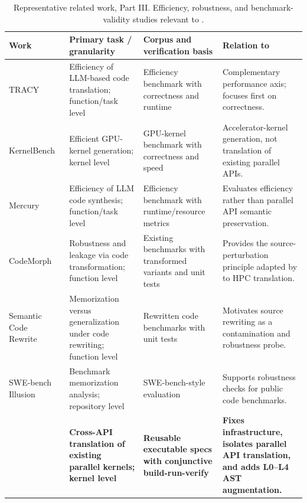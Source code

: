 \begin{table}[p]
\centering
\caption{
Representative related work, Part III. Efficiency, robustness, and benchmark-validity studies relevant to \parbench{}.
}
\label{tab:related-work-d}
\scriptsize
\setlength{\tabcolsep}{3.2pt}
\renewcommand{\arraystretch}{1.05}
\begin{tabularx}{\textwidth}{@{}
>{\RaggedRight\arraybackslash}p{}
>{\RaggedRight\arraybackslash}p{}
>{\RaggedRight\arraybackslash}p{}
>{\RaggedRight\arraybackslash}X
@{}}
\toprule
Work & Primary task / granularity & Corpus and verification basis & Relation to \parbench{} \\
\midrule

TRACY~\cite{TRACY2025}
& Efficiency of LLM-based code translation; function/task level
& Efficiency benchmark with correctness and runtime
& Complementary performance axis; \parbench{} focuses first on correctness. \\

KernelBench~\cite{KernelBench2025}
& Efficient GPU-kernel generation; kernel level
& GPU-kernel benchmark with correctness and speed
& Accelerator-kernel generation, not translation of existing parallel APIs. \\

Mercury~\cite{Mercury2024}
& Efficiency of LLM code synthesis; function/task level
& Efficiency benchmark with runtime/resource metrics
& Evaluates efficiency rather than parallel API semantic preservation. \\

CodeMorph~\cite{CodeMorph2025}
& Robustness and leakage via code transformation; function level
& Existing benchmarks with transformed variants and unit tests
& Provides the source-perturbation principle adapted by \parbench{} to HPC translation. \\

Semantic Code Rewrite~\cite{MemorizeOrGeneralize2025}
& Memorization versus generalization under code rewriting; function level
& Rewritten code benchmarks with unit tests
& Motivates source rewriting as a contamination and robustness probe. \\

SWE-bench Illusion~\cite{SWEbenchIllusion2025}
& Benchmark memorization analysis; repository level
& SWE-bench-style evaluation
& Supports robustness checks for public code benchmarks. \\

\textbf{\parbench{}}
& \textbf{Cross-API translation of existing parallel kernels; kernel level}
& \textbf{Reusable executable specs with conjunctive build-run-verify}
& \textbf{Fixes infrastructure, isolates parallel API translation, and adds L0--L4 AST augmentation.} \\

\bottomrule
\end{tabularx}
\end{table}

